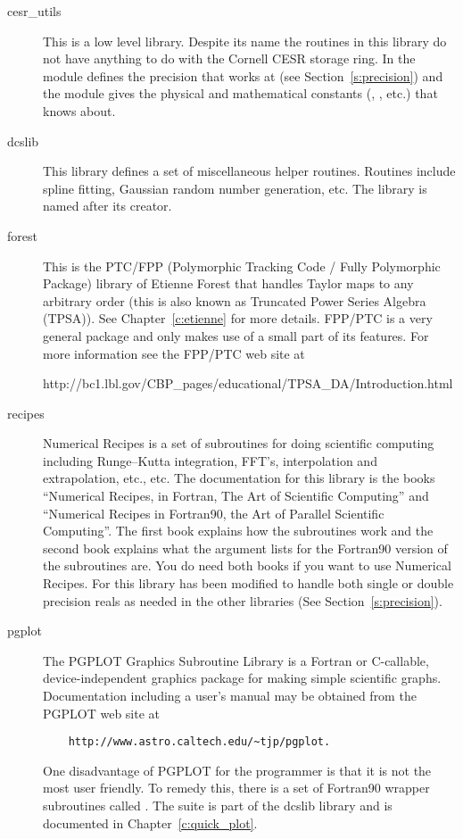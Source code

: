 \begin{description}

\item[cesr\_utils] 
This is a low level library. Despite its name the
routines in this library do not have anything to do with the Cornell
CESR storage ring.  In  the module 
defines the precision that \bmad works at (see
Section~\ref{s:precision}) and the module 
gives the physical and mathematical constants (, ,
etc.) that \bmad knows about.

\item[dcslib] 
This library defines a set of miscellaneous helper
routines.  Routines include spline fitting, Gaussian random number
generation, etc. The library is named after its creator.

\item[forest] 
This is the PTC/FPP (Polymorphic Tracking Code /
Fully Polymorphic Package) library of Etienne Forest that handles
Taylor maps to any arbitrary order (this is also known as Truncated
Power Series Algebra (TPSA)). See Chapter~\ref{c:etienne} for more
details.  FPP/PTC is a very general package and \bmad only makes use
of a small part of its features.  For more information see the FPP/PTC
web site at
\begin{example} 
   http://bc1.lbl.gov/CBP_pages/educational/TPSA_DA/Introduction.html
\end{example}

\item[recipes] 
Numerical Recipes is a set of subroutines for doing
scientific computing including Runge--Kutta integration, FFT's,
interpolation and extrapolation, etc., etc. The documentation for this
library is the books ``Numerical Recipes, in Fortran, The Art of
Scientific Computing'' and ``Numerical Recipes in
Fortran90, the Art of Parallel Scientific Computing''\cite{b:nr}.
The first book explains how the subroutines work and the second book
explains what the argument lists for the Fortran90 version of the
subroutines are. You do need both books if you want to use Numerical
Recipes.  For \bmad this library has been modified to handle both
single or double precision reals as needed in the other libraries (See
Section~\ref{s:precision}).

\item[pgplot] 
The PGPLOT Graphics Subroutine Library is a Fortran or
C-callable, device-independent graphics package for making simple
scientific graphs. Documentation including a user's manual may be
obtained from the PGPLOT web site at
\begin{verbatim}
    http://www.astro.caltech.edu/~tjp/pgplot.
\end{verbatim} 
One disadvantage of PGPLOT for the programmer is that it is not the
most user friendly. To remedy this, there is a set of Fortran90
wrapper subroutines called .  The 
suite is part of the dcslib library and is documented in
Chapter~\ref{c:quick_plot}.


\end{description}
